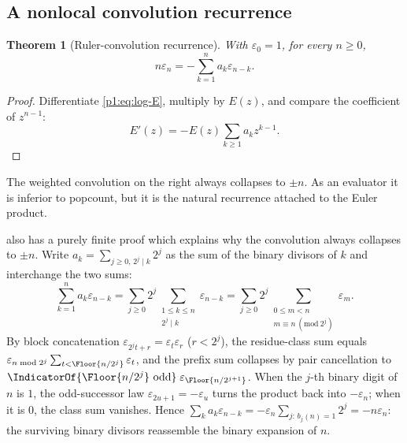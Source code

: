 \documentclass[11pt,oneside]{article}
\numberwithin{equation}{section}
\newtheorem{theorem}{Theorem}[section]
\theoremstyle{definition}
\theoremstyle{remark}
\newcommand{\eps}{\varepsilon}
\begin{document}
\subsection{A nonlocal convolution recurrence}

\begin{theorem}[Ruler-convolution recurrence]
\label{p1:thm:ruler-convolution}
With \(\eps_0=1\), for every \(n\ge0\),
\begin{equation}
  \boxed{
  n\eps_n=-\sum_{k=1}^{n}a_k\eps_{n-k}.}
  \label{p1:eq:ruler-convolution}
\end{equation}
\end{theorem}

\begin{proof}
Differentiate \eqref{p1:eq:log-E}, multiply by \(E(z)\), and compare the
coefficient of \(z^{n-1}\):
\[
 E'(z)=-E(z)\sum_{k\ge1}a_kz^{k-1}.
\]
\end{proof}

The weighted convolution on the right always collapses to \(\pm n\).  As an
evaluator it is inferior to popcount, but it is the natural recurrence attached
to the Euler product.

\begin{remark}
\label{p1:rem:ruler-convolution-combinatorial}
 also has a purely finite proof which explains
why the convolution always collapses to \(\pm n\).  Write
\(a_k=\sum_{j\ge0,\,2^j\mid k}2^j\) as the sum of the binary divisors
of \(k\) and interchange the two sums:
\[
 \sum_{k=1}^{n}a_k\eps_{n-k}
 =\sum_{j\ge0}2^j\!\!\sum_{\substack{1\le k\le n\\2^j\mid k}}\!\!\eps_{n-k}
 =\sum_{j\ge0}2^j\!\!\sum_{\substack{0\le m<n\\ m\equiv n\ (\mathrm{mod}\ 2^j)}}\!\!\eps_m.
\]
By block concatenation \(\eps_{2^jt+r}=\eps_t\eps_r\) (\(r<2^j\)),
the residue-class sum equals
\(\eps_{n\bmod2^j}\sum_{t<\Floor{n/2^j}}\eps_t\), and the
prefix sum collapses by pair cancellation to
\(\IndicatorOf{\Floor{n/2^j}\text{ odd}}\;\eps_{\Floor{n/2^{j+1}}}\).
When the \(j\)-th binary digit of \(n\) is \(1\), the odd-successor
law \(\eps_{2u+1}=-\eps_u\) turns the product back into \(-\eps_n\);
when it is \(0\), the class sum vanishes.  Hence
\(\sum_ka_k\eps_{n-k}=-\eps_n\sum_{j:\,b_j(n)=1}2^j=-n\eps_n\):
the surviving binary divisors reassemble the binary expansion of \(n\).
\end{remark}
\end{document}
